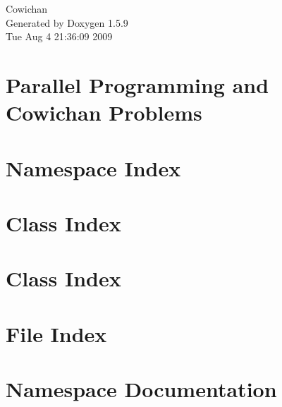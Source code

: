 \documentclass[a4paper]{book}
\begin{document}
\hypersetup{pageanchor=false}
\begin{titlepage}
\vspace*{7cm}
\begin{center}
{\Large Cowichan }\\
\vspace*{1cm}
{\large Generated by Doxygen 1.5.9}\\
\vspace*{0.5cm}
{\small Tue Aug 4 21:36:09 2009}\\
\end{center}
\end{titlepage}
\clearemptydoublepage
{}
\tableofcontents
\clearemptydoublepage
{}
\hypersetup{pageanchor=true}
\chapter{Parallel Programming and Cowichan Problems}
\label{index}\hypertarget{index}{}
\chapter{Namespace Index}

\chapter{Class Index}

\chapter{Class Index}

\chapter{File Index}

\chapter{Namespace Documentation}




\end{document}
